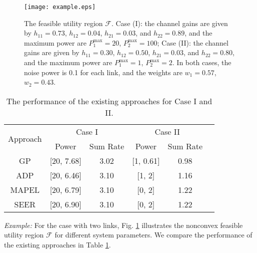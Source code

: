 \documentclass[10pt,journal,letterpaper,compsoc]{IEEEtran}
\begin{document}
\begin{figure}[t]
\centering
\hspace{-0cm}
 {\texttt{[image: example.eps]}}\hspace{-0.0cm}\vspace{0cm}
\caption{The feasible utility region $\mathcal{F}$. Case (I): the channel gains are given by $h_{11}=0.73$, $h_{12}=0.04$, $h_{21}=0.03$, and $h_{22}=0.89$, and the maximum power are $P_1^{\max}=20$, $P_2^{\max}=100$; Case (II): the channel gains are given by $h_{11}=0.30$, $h_{12}=0.50$, $h_{21}=0.03$, and $h_{22}=0.80$, and the maximum power are $P_1^{\max}=1$, $P_2^{\max}=2$. In both cases, the noise power is 0.1 for each link, and the weights are $w_1=0.57$, $w_2=0.43$.}\label{fig:example}
\end{figure}

\begin{table}
\centering
\begin{tabular}{|c|c|c|c|c|c|}
\hline
\multirow{2}{*}{Approach} & \multicolumn{2}{c|}{Case I} & \multicolumn{2}{c|}{Case II}\\
\cline{2-5}
&Power  & Sum Rate & Power  & Sum Rate\\
\hline
GP & [20, 7.68] & 3.02 & [1, 0.61]& 0.98\\
\hline
ADP & [20, 6.46] & 3.10 & [1, 2]& 1.16\\
\hline
MAPEL & [20, 6.79] & 3.10 &[0, 2]& 1.22\\
\hline
SEER & [20, 6.90] & 3.10 &[0, 2]& 1.22\\
\hline
\end{tabular}
\caption{The performance of the existing approaches for Case I and II.}\label{tab:performance}
\end{table}

\emph{Example:} For the case with two links, Fig. \ref{fig:example} illustrates the nonconvex feasible utility region $\mathcal{F}$ for different system parameters. We compare the performance of the existing approaches \cite{chiang:2008,huang:2006,qian:2010,qian:2009} in Table \ref{tab:performance}.
\end{document}
